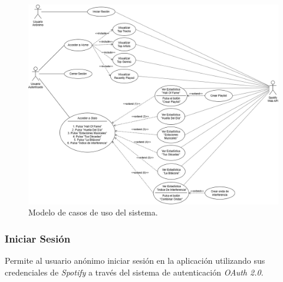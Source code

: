 \begin{figure}[H]
    \centering
    \includegraphics[width=\textwidth]{figures/modelo_casos_uso.png}
    \caption{Modelo de casos de uso del sistema.}
    \label{fig:modelo_casos_uso}
\end{figure}


\subsubsection*{Iniciar Sesión}

Permite al usuario anónimo iniciar sesión en la aplicación utilizando sus credenciales de \textit{Spotify} a través del sistema de autenticación \textit{OAuth 2.0}.

